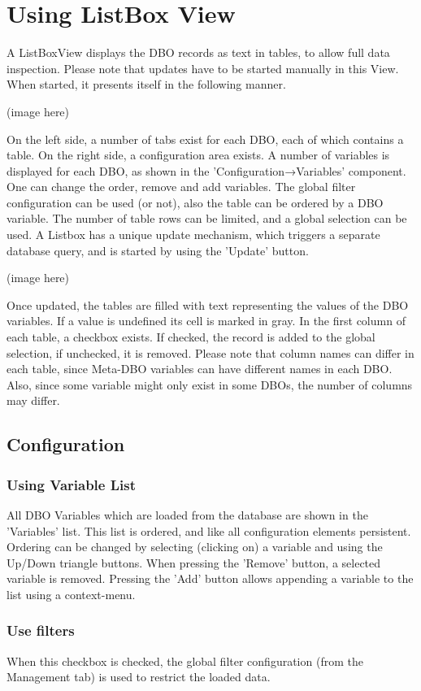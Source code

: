 \documentclass[10pt,letterpaper,extrafontsizes]{memoir}
\begin{document}
\section{Using ListBox View}
A ListBoxView displays the DBO records as text in tables, to allow full data inspection.  Please
note that updates have to be started manually in this View. When started, it presents itself in the following manner.

(image here)

On the left side, a number of tabs exist for each DBO, each of which contains a table. On the right side,
a configuration area exists.
A number of variables is displayed for each DBO, as shown in the 'Configuration→Variables' component. One can change the order, remove and add variables. The global filter configuration can be used (or not), also the table can be ordered by a DBO variable.  The number of table rows can be limited, and a global selection can be used.
A Listbox has a unique update mechanism, which triggers a separate database query, and is started by
using the 'Update' button.

(image here)

Once updated, the tables are filled with text representing the values of the DBO variables.  If a value is
undefined its cell is marked in gray.
In the first column of each table, a checkbox exists. If checked, the record is added to the global selection,
if unchecked, it is removed.
Please note that column names can differ in each table, since Meta-DBO variables can have different
names in each DBO. Also, since some variable might only exist in some DBOs, the number of columns
may differ.

\subsection{Configuration}
\subsubsection{Using Variable List}
All DBO Variables which are loaded from the database are shown in the 'Variables' list. This list is ordered,
and like all configuration elements persistent. Ordering can be changed by selecting (clicking on) a variable
and using the Up/Down triangle buttons.
When pressing the 'Remove' button, a selected variable is removed.  Pressing the 'Add' button allows
appending a variable to the list using a context-menu.

\subsubsection{Use filters}
When this checkbox is checked, the global filter configuration (from the Management tab) is used to restrict
the loaded data.
\end{document}
